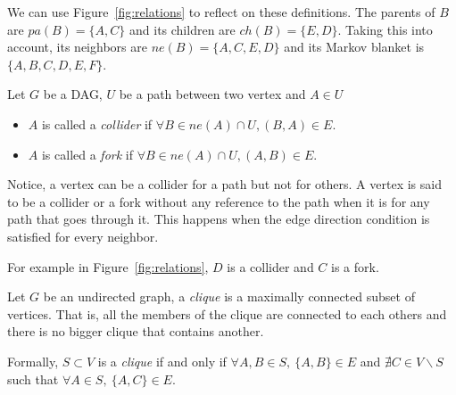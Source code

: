 We can use Figure~\ref{fig:relations} to reflect on these definitions. The parents
of \(B\) are \(pa(B) = \{A,C\}\) and its children are \(ch(B) = \{E,D\}\). Taking this into account, its neighbors
are \(ne(B) = \{A,C,E,D\}\) and its Markov blanket is \(\{A,B,C,D,E,F\}\).

\begin{definition} Let \(G\) be a DAG, \(U\) be a path between two vertex and \(A \in U\)
  \begin{itemize}
  \item \( A \) is called a \emph{collider} if \(\forall B \in ne(A)\cap U, (B,A)\in
    E\).
  \item \( A \) is called a \emph{fork} if \(\forall B \in ne(A) \cap U, (A,B)\in
    E\).
  \end{itemize}
  Notice, a vertex can be a collider for a path but not for others. A vertex is said to be a collider or a fork without any reference to the path when it is for any path that goes through it. This happens when the edge direction condition is satisfied for every neighbor.

  For example in Figure~\ref{fig:relations}, \(D\) is a collider and \( C \) is
  a fork.
\end{definition}

\begin{definition}
Let \(G\) be an undirected graph, a \emph{clique} is a maximally connected
subset of vertices. That is, all the members of the clique are connected to each
others and there is no bigger clique that contains another.

Formally, \(S \subset V\) is a \emph{clique} if and only if \(\forall A,B \in S,
\ \{A,B\} \in E\) and \(\nexists C \in V\backslash S\) such that \(\forall A \in
S, \ \{A, C\} \in E \).
\end{definition}
